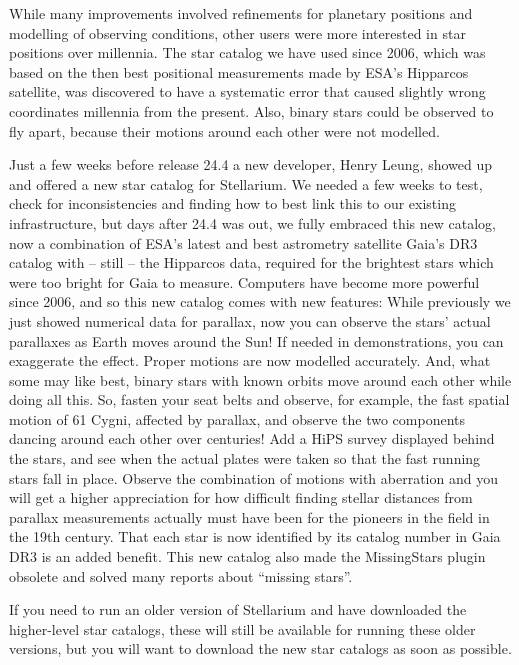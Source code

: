 While many improvements involved  refinements for planetary positions and modelling of observing conditions, 
other users were more interested in star positions over millennia. 
The star catalog we have used since 2006, which was based on the 
then best positional measurements made by ESA's Hipparcos satellite,  was discovered to have 
a systematic error that caused slightly wrong coordinates millennia from the present. 
Also, binary stars could be observed to fly apart, because their motions around each other were not modelled. 

Just a few weeks before release 24.4 a new developer, Henry Leung, showed up and offered a new star catalog for Stellarium. 
We needed a few weeks to test, check for inconsistencies and finding how to best link this to our existing infrastructure, 
but days after 24.4 was out, we fully embraced this new catalog, now a combination of ESA's latest 
and best astrometry satellite Gaia's DR3 catalog with -- still -- the Hipparcos data, 
required for the brightest stars which were too bright for Gaia to measure. 
Computers have become more powerful since 2006, and so this new catalog comes with new features: While previously 
we just showed numerical data for parallax, now you can observe the stars' actual parallaxes as Earth moves around the Sun! 
If needed in demonstrations, you can exaggerate the effect.
Proper motions are now modelled accurately. And, what some may like best, 
binary stars with known orbits move around each other while doing all this. 
So, fasten your seat belts and observe, for example, the fast spatial motion of 61 Cygni, affected by parallax, 
and observe the two components dancing around each other over centuries! Add a HiPS survey displayed behind the stars, 
and see when the actual plates were taken so that the fast running stars fall in place. 
Observe the combination of motions with aberration and you will get a higher appreciation for how difficult 
finding stellar distances from parallax measurements actually must have been for the pioneers in the field in the 19th century.
That each star is now identified by its catalog number in Gaia DR3 is an added benefit. 
This new catalog also made the MissingStars plugin obsolete and solved many reports about ``missing stars''. 

If you need to run an older version of Stellarium and have downloaded the higher-level star catalogs, 
these will still be available for running these older versions, but you will want to download the new star catalogs as soon as possible. 


